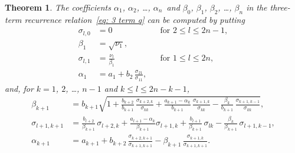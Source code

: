 \documentclass[12pt,a4paper]{article}
\newtheorem{theorem}{Theorem}
\begin{document}
\begin{theorem}
The coefficients $\alpha_1$, $\alpha_2$, \dots, $\alpha_n$~and 
$\beta_0$, $\beta_1$, $\beta_2$, \dots, $\beta_n$ in the three-term 
recurrence relation~\eqref{eq: 3 term q} can be computed by putting
\[
\begin{aligned}
\sigma_{l,0}&=0&&\text{for $2\le l\le 2n-1$},\\
\beta_1&=\sqrt{\nu_1},\\
\sigma_{l,1}&=\frac{\nu_l}{\beta_1}&
	&\text{for $1\le l\le2n$},\\
\alpha_1&=a_1+b_2\,\frac{\sigma_{21}}{\sigma_{11}},
\end{aligned} 
\]
and, for $k=1$, $2$, \dots, $n-1$ and $k\le l\le2n-k-1$, 
\[
\begin{aligned}
\beta_{k+1}&=b_{k+1}\sqrt{1
		+\frac{b_{k+2}}{b_{k+1}}\,\frac{\sigma_{k+2,k}}{\sigma_{kk}}
		+\frac{a_{k+1}-\alpha_k}{b_{k+1}}\,
			\frac{\sigma_{k+1,k}}{\sigma_{kk}}
		-\frac{\beta_k}{b_{k+1}}\,
			\frac{\sigma_{k+1,k-1}}{\sigma_{kk}}},\\
\sigma_{l+1,k+1}&=\frac{b_{l+2}}{\beta_{k+1}}\,\sigma_{l+2,k}
	+\frac{a_{l+1}-\alpha_k}{\beta_{k+1}}\sigma_{l+1,k}
	+\frac{b_{l+1}}{\beta_{k+1}}\,\sigma_{lk}
	-\frac{\beta_k}{\beta_{k+1}}\,\sigma_{l+1,k-1},\\
\alpha_{k+1}&=a_{k+1}+b_{k+2}\,
	\frac{\sigma_{k+2,k+1}}{\sigma_{k+1,k+1}}
	-\beta_{k+1}\,\frac{\sigma_{k+1,k}}{\sigma_{k+1,k+1}}.
\end{aligned}
\]
\end{theorem}
\end{document}
